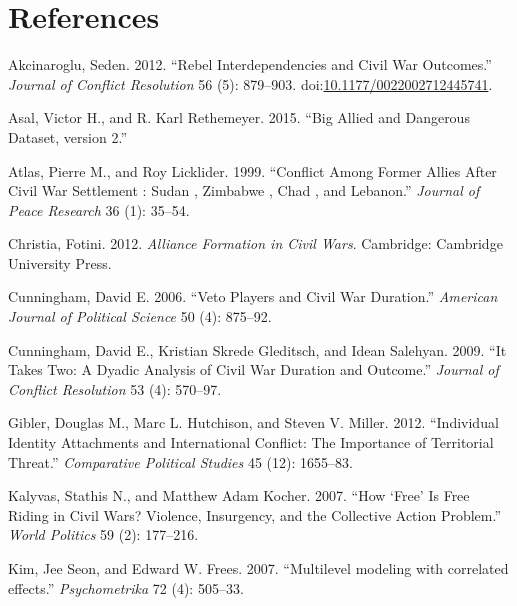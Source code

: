 \documentclass[12pt,]{book}
\theoremstyle{definition}
\theoremstyle{definition}
\theoremstyle{remark}
\begin{document}
\chapter*{References}\label{references}


\indent

\setlength{\parindent}{-0.2in} \setlength{\leftskip}{0.2in}
\setlength{\parskip}{8pt}

\singlespacing

\hypertarget{refs}{}
\hypertarget{ref-Akcinaroglu2012}{}
Akcinaroglu, Seden. 2012. ``Rebel Interdependencies and Civil War
Outcomes.'' \emph{Journal of Conflict Resolution} 56 (5): 879--903.
doi:\href{https://doi.org/10.1177/0022002712445741}{10.1177/0022002712445741}.

\hypertarget{ref-Asal2015}{}
Asal, Victor H., and R. Karl Rethemeyer. 2015. ``Big Allied and
Dangerous Dataset, version 2.''

\hypertarget{ref-Atlas1999}{}
Atlas, Pierre M., and Roy Licklider. 1999. ``Conflict Among Former
Allies After Civil War Settlement : Sudan , Zimbabwe , Chad , and
Lebanon.'' \emph{Journal of Peace Research} 36 (1): 35--54.

\hypertarget{ref-Christia2012}{}
Christia, Fotini. 2012. \emph{Alliance Formation in Civil Wars}.
Cambridge: Cambridge University Press.

\hypertarget{ref-Cunningham2006}{}
Cunningham, David E. 2006. ``Veto Players and Civil War Duration.''
\emph{American Journal of Political Science} 50 (4): 875--92.

\hypertarget{ref-Cunningham2009}{}
Cunningham, David E., Kristian Skrede Gleditsch, and Idean Salehyan.
2009. ``It Takes Two: A Dyadic Analysis of Civil War Duration and
Outcome.'' \emph{Journal of Conflict Resolution} 53 (4): 570--97.

\hypertarget{ref-Gibler2012}{}
Gibler, Douglas M., Marc L. Hutchison, and Steven V. Miller. 2012.
``Individual Identity Attachments and International Conflict: The
Importance of Territorial Threat.'' \emph{Comparative Political Studies}
45 (12): 1655--83.

\hypertarget{ref-Kalyvas2007}{}
Kalyvas, Stathis N., and Matthew Adam Kocher. 2007. ``How `Free' Is Free
Riding in Civil Wars? Violence, Insurgency, and the Collective Action
Problem.'' \emph{World Politics} 59 (2): 177--216.

\hypertarget{ref-Kim2007}{}
Kim, Jee Seon, and Edward W. Frees. 2007. ``Multilevel modeling with
correlated effects.'' \emph{Psychometrika} 72 (4): 505--33.
\end{document}
